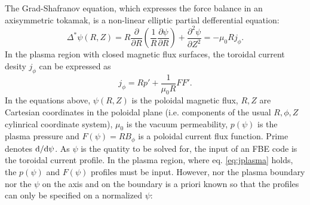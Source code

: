 The Grad-Shafranov equation, which expresses the force balance in an axisymmetric tokamak, is a non-linear elliptic partial defferential equation:
\begin{equation}
\label{eq:gs}
{\Delta ^*}\psi \left( {R,Z} \right) = R\frac{\partial }{{\partial R}}\left( {\frac{1}{R}\frac{{\partial \psi }}{{\partial R}}} \right) + \frac{{{\partial ^2}\psi }}{{\partial {Z^2}}} =  - {\mu _0}R{j_\phi }.
\end{equation}
In the plasma region with closed magnetic flux surfaces, the toroidal current desity $j_\phi$ can be expressed as
\begin{equation}
\label{eq:jplasma}
{j_\phi } = Rp' + \frac{1}{{{\mu _0}R}}FF'.
\end{equation}
In the equations above, $\psi \left( {R,Z} \right)$ is the poloidal magnetic flux, $R,Z$ are Cartesian coordinates in the poloidal plane (i.e. components of the usual $R, \phi , Z$ cylinrical coordinate system), $\mu_0$ is the vacuum permeability, $p\left(\psi\right)$ is the plasma pressure and $F\left(\psi\right) = RB_\phi$ is a poloidal current flux function.
Prime denotes ${\rm{d}}/{{\rm{d}}\psi}$. As $\psi$ is the quatity to be solved for, the input of an FBE code is the toroidal current profile. In the plasma region, where eq. \ref{eq:jplasma} holds, the $p\left(\psi\right)$ and $F\left(\psi\right)$ profiles must be input. However, nor the plasma boundary nor the $\psi$ on the axis and on the boundary is a priori known so that the profiles can only be specified on a normalized $\psi$:
